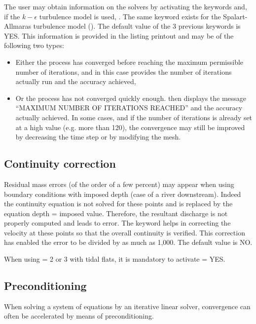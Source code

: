 The user may obtain information on the solvers by activating the keywords
 and, if the $k-\epsilon$ turbulence model
is used, .
The same keyword exists for the Spalart-Allmaras turbulence model
().
The default value of the 3 previous keywords is YES.
This information is provided in the listing printout
and may be of the following two types:
\begin{itemize}
\item Either the process has converged before reaching the maximum permissible
number of iterations, and in this case  provides the number of
iterations actually run and the accuracy achieved,
\item Or the process has not converged quickly enough.
 then displays the message ``MAXIMUM NUMBER OF ITERATIONS REACHED''
and the accuracy actually achieved.
In some cases, and if the number of iterations is already set
at a high value (e.g. more than 120), the convergence may still be improved
by decreasing the time step or by modifying the mesh.
\end{itemize}

\subsection{Continuity correction}

Residual mass errors (of the order of a few percent) may appear when using
boundary conditions with imposed depth (case of a river downstream).
Indeed the continuity equation is not solved for these points and is replaced
by the equation depth = imposed value.
Therefore, the resultant discharge is not properly computed and leads to error.
The keyword  helps in correcting the velocity
at these points so that the overall continuity is verified.
This correction has enabled the error to be divided by as much as 1,000.
The default value is NO.

When using  = 2 or 3 with tidal flats,
it is mandatory to activate  = YES.


\subsection{Preconditioning}

When solving a system of equations by an iterative linear solver,
convergence can often be accelerated by means of preconditioning.


